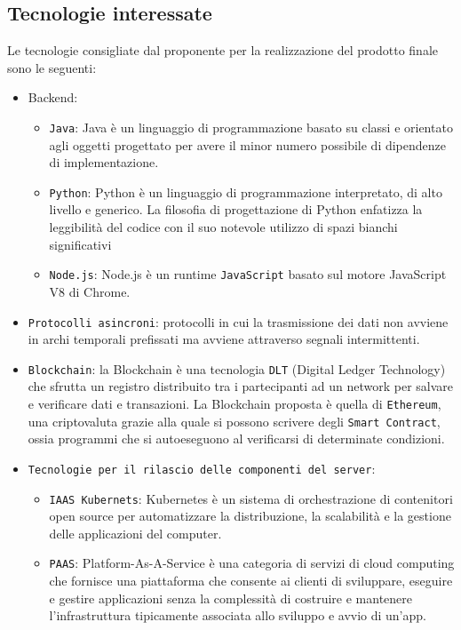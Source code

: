 \subsection{Tecnologie interessate}
Le tecnologie consigliate dal proponente per la realizzazione del prodotto finale sono le seguenti:
\begin{itemize}
	\item Backend:
	\begin{itemize}
		\item \verb|Java|: Java è un linguaggio di programmazione basato su classi e orientato agli oggetti progettato per avere il minor numero possibile di dipendenze di implementazione.
		\item \verb|Python|: Python è un linguaggio di programmazione interpretato, di alto livello e generico. La filosofia di progettazione di Python enfatizza la leggibilità del codice con il suo notevole utilizzo di spazi bianchi significativi
		\item \verb|Node.js|: Node.js è un runtime \verb|JavaScript| basato sul motore JavaScript V8 di Chrome.
	\end{itemize}
	\item \verb|Protocolli asincroni|: protocolli in cui la trasmissione dei dati non avviene in archi temporali prefissati ma avviene attraverso segnali intermittenti.
	\item \verb|Blockchain|: la Blockchain è una tecnologia \verb|DLT| (Digital Ledger Technology) che sfrutta un registro distribuito tra i partecipanti ad un network per salvare e verificare dati e transazioni. La Blockchain proposta è quella di \verb|Ethereum|, una criptovaluta grazie alla quale si possono scrivere degli \verb|Smart Contract|, ossia programmi che si autoeseguono al verificarsi di determinate condizioni.
	\item \verb|Tecnologie per il rilascio delle componenti del server|:
	\begin{itemize}
		\item \verb|IAAS Kubernets|: Kubernetes è un sistema di orchestrazione di contenitori open source per automatizzare la distribuzione, la scalabilità e la gestione delle applicazioni del computer.
		\item \verb|PAAS|: Platform-As-A-Service è una categoria di servizi di cloud computing che fornisce una piattaforma che consente ai clienti di sviluppare, eseguire e gestire applicazioni senza la complessità di costruire e mantenere l'infrastruttura tipicamente associata allo sviluppo e avvio di un'app. 
	\end{itemize}	
\end{itemize}

